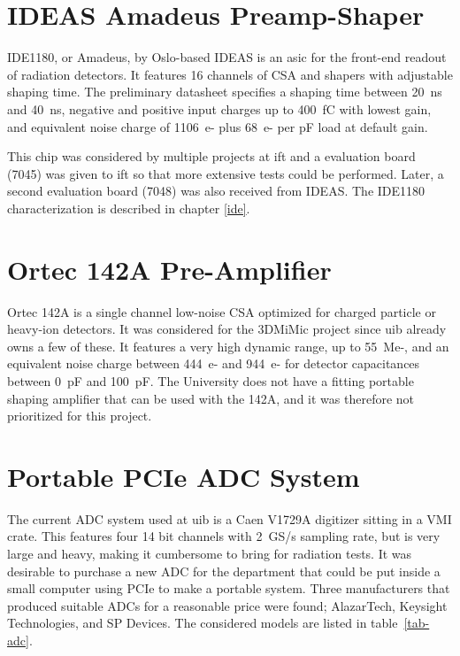 \documentclass[../main/thesis.tex]{subfiles}
\begin{document}
\section{IDEAS Amadeus Preamp-Shaper}
\label{e-ide1180}
IDE1180, or Amadeus, by Oslo-based IDEAS is an \gls{asic} for the front-end readout of radiation detectors. It features 16 channels of \gls{CSA} and shapers with adjustable shaping time. The preliminary datasheet \citep{IDE1180} specifies a shaping time between 20~ns and 40~ns, negative and positive input charges up to 400~fC with lowest gain, and equivalent noise charge of 1106~e- plus 68~e- per pF load at default gain. 

This chip was considered by multiple projects at \gls{ift} and a evaluation board (7045) was given to \gls{ift} so that more extensive tests could be performed. Later, a second evaluation board (7048) was also received from IDEAS. The IDE1180 characterization is described in chapter \ref{ide}. 

\section{Ortec 142A Pre-Amplifier}
\label{e-ortec}
Ortec 142A is a single channel low-noise \gls{CSA} optimized for charged particle or heavy-ion detectors. It was considered for the 3DMiMic project since \gls{uib} already owns a few of these. It features a very high dynamic range, up to 55~Me-, and an equivalent noise charge between 444~e- and 944~e- for detector capacitances between 0~pF and 100~pF. 
The University does not have a fitting portable shaping amplifier that can be used with the 142A, and it was therefore not prioritized for this project. 


\section{Portable PCIe ADC System}
\label{e-adc}
The current \gls{ADC} system used at \gls{uib} is a Caen V1729A digitizer sitting in a VMI crate. This features four 14 bit channels with 2~GS/s sampling rate, but is very large and heavy, making it cumbersome to bring for radiation tests. It was desirable to purchase a new \gls{ADC} for the department that could be put inside a small computer using \gls{PCIe} to make a portable system. Three manufacturers that produced suitable \gls{ADC}s for a reasonable price were found; AlazarTech, Keysight Technologies, and SP Devices. The considered models are listed in table~\ref{tab-adc}. 
\end{document}
